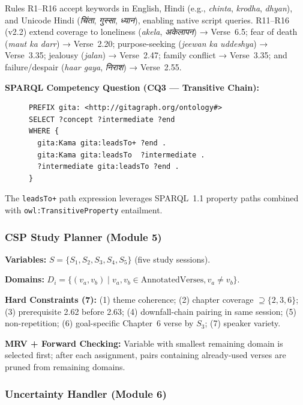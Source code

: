 \documentclass[conference]{IEEEtran}
\newcommand{\dv}[1]{{\devfont #1}}
\begin{document}
Rules R1--R16 accept keywords in English, Hindi (e.g., \textit{chinta},
\textit{krodha}, \textit{dhyan}), and Unicode Hindi (\textit{\dv{चिंता}},
\textit{\dv{गुस्सा}}, \textit{\dv{ध्यान}}), enabling native script queries.
R11--R16 (v2.2) extend coverage to loneliness (\textit{akela},
\textit{\dv{अकेलापन}}) → Verse~6.5; fear of death (\textit{maut ka darr}) →
Verse~2.20; purpose-seeking (\textit{jeewan ka uddeshya}) → Verse~3.35;
jealousy (\textit{jalan}) → Verse~2.47; family conflict → Verse~3.35; and
failure/despair (\textit{haar gaya}, \textit{\dv{निराश}}) → Verse~2.55.

\textbf{SPARQL Competency Question (CQ3 — Transitive Chain):}

\begin{figure}[tbp]
\begin{lstlisting}[language=SPARQL, caption={CQ3: Desire downfall chain via transitivity}, label={lst:sparql}]
PREFIX gita: <http://gitagraph.org/ontology#>
SELECT ?concept ?intermediate ?end
WHERE {
  gita:Kama gita:leadsTo+ ?end .
  gita:Kama gita:leadsTo  ?intermediate .
  ?intermediate gita:leadsTo ?end .
}
\end{lstlisting}
\end{figure}
The \texttt{leadsTo+} path expression leverages SPARQL~1.1 property paths
combined with \texttt{owl:TransitiveProperty} entailment.

\subsubsection{CSP Study Planner (Module 5)}

\textbf{Variables:} $S = \{S_1, S_2, S_3, S_4, S_5\}$ (five study sessions).

\textbf{Domains:} $D_i = \{(v_a, v_b) \mid v_a, v_b \in \text{AnnotatedVerses}, v_a \neq v_b\}$.

\textbf{Hard Constraints (7):} (1) theme coherence; (2) chapter coverage
$\supseteq \{2,3,6\}$; (3) prerequisite 2.62 before 2.63;
(4) downfall-chain pairing in same session; (5) non-repetition;
(6) goal-specific Chapter~6 verse by $S_3$; (7) speaker variety.

\textbf{MRV + Forward Checking:} Variable with smallest remaining domain
is selected first; after each assignment, pairs containing already-used
verses are pruned from remaining domains.

\subsubsection{Uncertainty Handler (Module 6)}
\end{document}
